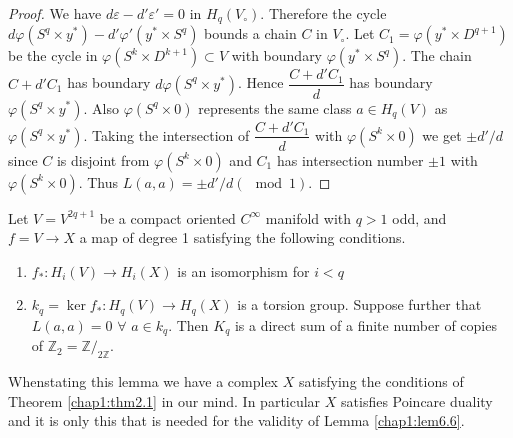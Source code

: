 \begin{proof}
We have $ d \varepsilon - d' \varepsilon' =0$ in $ H_q
(V_\circ)$. Therefore the cycle $d \varphi (S^q \times y^* ) - d' \varphi
' (y^* \times S^q )$ bounds a chain $C$ in $ V_\circ$. Let $ C_1 = \varphi
(y^* \times D^{q+1})$ be the cycle in $\varphi (S^k \times D^{k+1})
\subset V$ with boundary $ \varphi (y^* \times  S^q)$. The chain $ C +
d' C_1$ has boundary $d \varphi (S^q \times y^*)$. Hence $\dfrac{C+ d'
  C_1}{d}$ has boundary $ \varphi (S^q \times y^*)$. Also $\varphi
(S^q \times 0)$ represents the same class $a \in H_q (V)$ as
$\varphi (S^q \times y^*)$. Taking the intersection of $ \dfrac{C+d'
  C_1}{d}$ with $\varphi (S^k \times 0)$ we get $ \pm d' / d$ since
$C$ is  disjoint from $ \varphi (S^k \times 0)$ and $C_1$ has
intersection number $ \pm 1$ with $ \varphi (S^k \times 0)$. Thus $ L
(a, a) = \pm d' / d (\mod 1)$.  
\end{proof}

\begin{lemma}\label{chap1:lem6.6} %
Let $V = V^{2q+1}$ be a compact oriented $C^\infty$ manifold with
$q>1$ odd, and $f = V \to X$ a map of degree 1 satisfying the
following conditions.  
\begin{enumerate}[(1)]
\item $f_* : H_i (V) \to H_i (X)$ is an isomorphism for $i< q$ 

\item $k_q = \ker f_* : H_q (V) \to H_q (X) $ is a torsion
  group. Suppose further that $L (a, a) = 0$ $\forall$ $a \in
  k_q$. Then $K_q$ is a direct sum of a finite number of copies of
  $\mathbb{Z}_{2} = \mathbb{Z}/_{2 \mathbb{Z}}$. 
\end{enumerate}
\end{lemma}

\begin{remark*}
When\pageoriginale stating this lemma we have a complex $X$ satisfying the
conditions of Theorem \ref{chap1:thm2.1} in our mind. In particular $X$ satisfies
Poincare duality and it is only this that is needed for the validity
of Lemma \ref{chap1:lem6.6}. 
\end{remark*}

